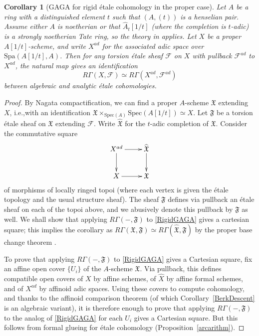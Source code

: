 \documentclass[reqno]{amsart}
\newcommand{\sF}{\mathcal{F}}
\newcommand{\spec}{\mathrm{Spec}}
\newtheorem{corollary}[theorem]{Corollary}
\theoremstyle{definition}
\begin{document}
\begin{corollary}[GAGA for rigid \'etale cohomology in the proper case]
Let $A$ be a ring with a distinguished element $t$ such that $(A,(t))$ is a
henselian pair. Assume either $A$ is noetherian or that $\widehat{A}_t[1/t]$ (where the completion is $t$-adic) is a strongly noetherian Tate ring, so the theory in \cite{HuberBook} applies. Let $X$ be a proper $A[1/t]$-scheme, and write $X^{ad}$ for the associated adic space over $\mathrm{Spa}(A[1/t],A)$. Then for any torsion \'etale sheaf $\sF$ on $X$ with pullback $\sF^{ad}$ to $X^{ad}$, the natural map gives an identification
\[ R\Gamma(X,\sF) \simeq R\Gamma(X^{ad},\sF^{ad})\]
between algebraic and analytic \'etale cohomologies.
\end{corollary}
\begin{proof}
By Nagata compactification, we can find a proper $A$-scheme $\mathfrak{X}$ extending $X$, i.e.,with an identification $\mathfrak{X} \times_{\spec(A)} \spec(A[1/t]) \simeq X$. Let $\mathfrak{F}$ be a torsion \'etale sheaf on $\mathfrak{X}$ extending $\sF$. Write $\widehat{\mathfrak{X}}$ for the $t$-adic completion of $\mathfrak{X}$. Consider the commutative square 
\begin{equation}
\label{RigidGAGA}
\xymatrix{ X^{ad} \ar[r] \ar[d] & \widehat{\mathfrak{X}} \ar[d] \\
		X \ar[r] & \mathfrak{X} }
\end{equation}
	of morphisms of locally ringed topoi (where each vertex is given the \'etale topology and the usual structure sheaf). The sheaf $\mathfrak{F}$ defines via pullback an \'etale sheaf on each of the topoi above, and we abusively denote this pullback by $\mathfrak{F}$ as well. We shall show that applying $R\Gamma(-,\mathfrak{F})$ to \eqref{RigidGAGA} gives a cartesian square; this implies the corollary as $R\Gamma(\mathfrak{X}, \mathfrak{F}) \simeq R\Gamma(\widehat{\mathfrak{X}}, \mathfrak{F})$ by the proper base change theorem 
	\cite[Exp.~XII, Th.~5.1]{SGA4}. 

To prove that applying $R\Gamma(-,\mathfrak{F})$ to \eqref{RigidGAGA} gives a Cartesian square, fix an affine open cover $\{U_i\}$ of the $A$-scheme $\mathfrak{X}$. Via pullback, this defines compatible open covers of $X$ by affine schemes, of $\widehat{X}$ by affine formal schemes, and of $X^{ad}$ by affinoid adic spaces. Using these covers to compute cohomology, and thanks to the affinoid comparison theorem \cite[Corollary 3.2.2]{HuberBook} (of which Corollary~\ref{BerkDescent} is an algebraic variant), it is therefore enough to prove that applying $R\Gamma(-,\mathfrak{F})$ to the analog of \eqref{RigidGAGA} for each $U_i$  gives a Cartesian square. But this follows  from formal glueing for \'etale cohomology (Proposition~\ref{arcarithm}).
\end{proof}
\end{document}
